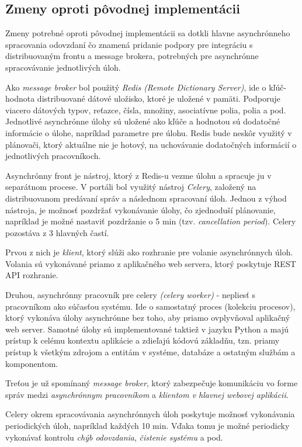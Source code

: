 \documentclass[
  digital, %
  twoside, %
  table,   %
  lof,     %
  lot,     %
]{fithesis3}
\begin{document}
\subsection{Zmeny oproti pôvodnej implementácii}

Zmeny potrebné oproti pôvodnej implementácii sa dotkli hlavne asynchrónneho spracovania odovzdaní čo znamená pridanie podpory pre integráciu s  distribuovaným frontu a message brokera, potrebných pre asynchrónne spracovávanie jednotlivých úloh. 

Ako \emph{message broker} bol použitý \emph{Redis (Remote Dictionary Server)}, ide o kľúč-hodnota distribuované dátové uložisko, ktoré je uložené v pamäti. Podporuje viacero dátových typov, reťazce, čísla, množiny, asociatívne polia, polia a pod. Jednotlivé asynchrónne úlohy sú uložené ako kľúče a hodnotou sú dodatočné informácie o úlohe, napríklad parametre pre úlohu. Redis bude neskôr využitý v plánovači, ktorý aktuálne nie je hotový, na uchovávanie dodatočných informácií o jednotlivých pracovníkoch.

Asynchrónny front je nástroj, ktorý z Redis-u vezme úlohu a spracuje ju v separátnom procese. V portáli bol využitý nástroj \emph{Celery}, založený na distribuovanom predávaní správ a následnom spracovaní úloh. Jednou z výhod nástroja, je možnosť pozdržať vykonávanie úlohy, čo zjednoduší plánovanie, napríklad je možné nastaviť pozdržanie o 5 min (tzv. \emph{cancellation period}).
Celery pozostáva z 3 hlavných častí. 

Prvou z nich je \emph{klient}, ktorý slúži ako rozhranie pre volanie asynchrónnych úloh. Volania sú vykonávané priamo z aplikačného web servera, ktorý poskytuje REST API rozhranie.

Druhou, asynchrónny pracovník pre celery \emph{(celery worker)} - nepliesť s pracovníkom ako súčasťou systému. Ide o samostatný proces (kolekciu procesov), ktorý vykonáva úlohy asynchrónne bez toho, aby priamo ovplyvňoval aplikačný web server. Samotné úlohy sú implementované taktiež v jazyku Python a majú prístup k celému kontextu aplikácie a zdieľajú kódovú základňu, tzn. priamy prístup k všetkým zdrojom a entitám v systéme, databáze a ostatným službám a komponentom.

Treťou je už spomínaný \emph{message broker}, ktorý zabezpečuje komunikáciu vo forme správ medzi \emph{asynchrónnym pracovníkom} a \emph{klientom v hlavnej webovej aplikácii}.

Celery okrem spracovávania asynchrónnych úloh poskytuje možnosť vykonávania periodických úloh, napríklad každých 10 min. Vďaka tomu je možné periodicky vykonávať kontrolu \emph{chýb odovzdania}, \emph{čistenie systému} a pod. 
\end{document}
